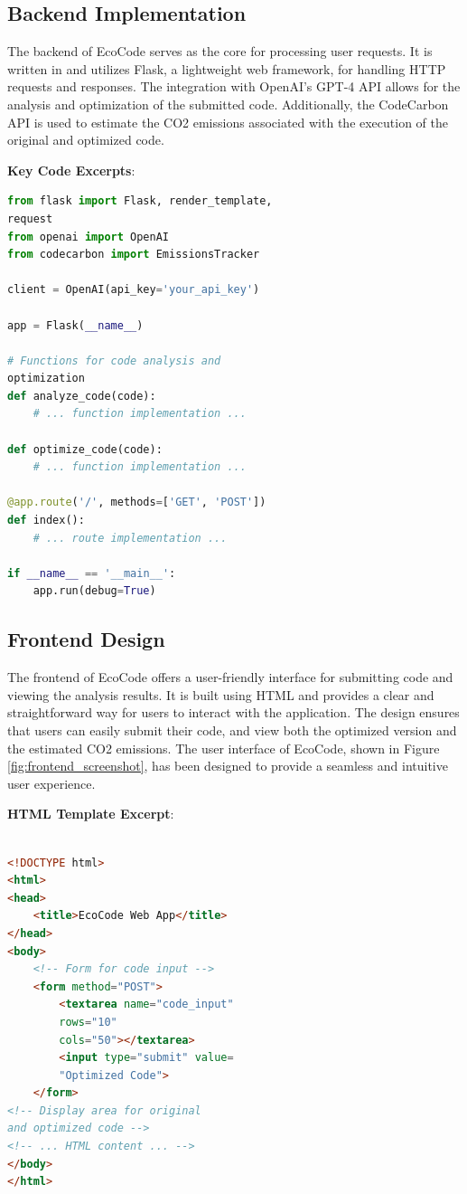 \documentclass[conference,compsoc]{IEEEtran}
\begin{document}
\subsection{Backend Implementation}
The backend of EcoCode serves as the core for processing user requests. It is written in  and utilizes Flask, a lightweight web framework, for handling HTTP requests and responses. The integration with OpenAI's GPT-4 API allows for the analysis and optimization of the submitted  code. Additionally, the CodeCarbon API is used to estimate the CO2 emissions associated with the execution of the original and optimized code.

\textbf{Key Code Excerpts}:
\begin{lstlisting}[language=Python, backgroundcolor=\color{lightgray}]
from flask import Flask, render_template,
request
from openai import OpenAI
from codecarbon import EmissionsTracker

client = OpenAI(api_key='your_api_key')

app = Flask(__name__)

# Functions for code analysis and 
optimization
def analyze_code(code):
    # ... function implementation ...

def optimize_code(code):
    # ... function implementation ...

@app.route('/', methods=['GET', 'POST'])
def index():
    # ... route implementation ...

if __name__ == '__main__':
    app.run(debug=True)
\end{lstlisting}

\subsection{Frontend Design}
The frontend of EcoCode offers a user-friendly interface for submitting  code and viewing the analysis results. It is built using HTML and provides a clear and straightforward way for users to interact with the application. The design ensures that users can easily submit their code, and view both the optimized version and the estimated CO2 emissions.
The user interface of EcoCode, shown in Figure \ref{fig:frontend_screenshot}, has been designed to provide a seamless and intuitive user experience.

\textbf{HTML Template Excerpt}:
\begin{lstlisting}[language=HTML, backgroundcolor=\color{lightgray}]

<!DOCTYPE html>
<html>
<head>
    <title>EcoCode Web App</title>
</head>
<body>
    <!-- Form for code input -->
    <form method="POST">
        <textarea name="code_input" 
		rows="10" 
        cols="50"></textarea>
        <input type="submit" value=
		"Optimized Code">
    </form>
<!-- Display area for original 
and optimized code -->
<!-- ... HTML content ... -->
</body>
</html>
\end{lstlisting}
\end{document}
